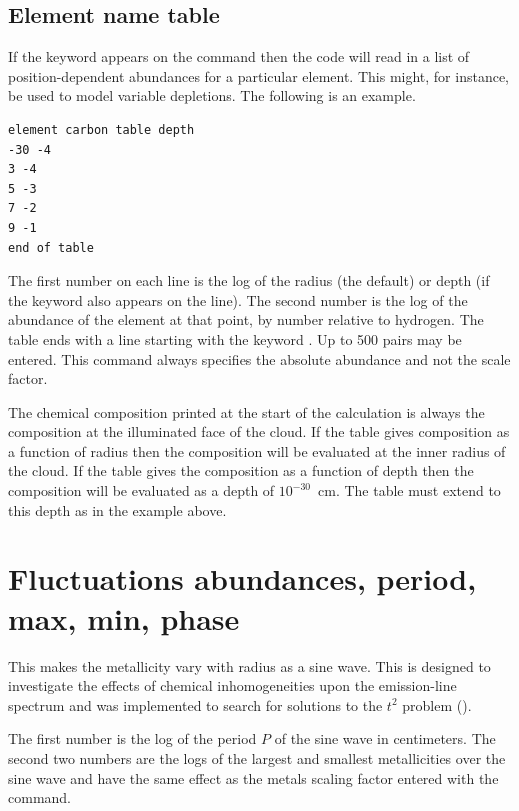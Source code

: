 \subsection{Element name table}

If the keyword  appears on
the  command then the code
will read in a list of position-dependent abundances for
a particular element.
This might, for instance, be used to model variable depletions.
The following is an example.
\begin{verbatim}
element carbon table depth
-30 -4
3 -4
5 -3
7 -2
9 -1
end of table
\end{verbatim}

The first number on each line is the log of the radius (the default)
or depth (if the keyword  also appears
on the  line).
The second number is the
log of the abundance of the element at that point, by number relative to
hydrogen.
The table ends with a line starting with the keyword
.
Up to 500 pairs may be entered.
This command always specifies the absolute
abundance and not the scale factor.

The chemical composition printed at the start of the calculation is always
the composition at the illuminated face of the cloud.  If the table gives
composition as a function of radius then the composition will be evaluated
at the inner radius of the cloud.  If the table gives the composition as
a function of depth then the composition will be evaluated as a depth of
$10^{-30}$~cm.  The table must extend to this depth as in the example above.

\section{Fluctuations abundances, period, max, min, phase}
\label{sec:FluctuationsAbundanceCommand}

This makes the metallicity vary with radius as a sine wave.  This is
designed to investigate the effects of chemical inhomogeneities upon the
emission-line spectrum and was implemented to search for solutions to the
$t^2$ problem (\citealp{KingdonFerland1995}).

The first number is the log of the period $P$ of the sine wave in
centimeters.
The second two numbers are the logs of the largest and smallest
metallicities over the sine wave and have the same effect as the metals
scaling factor entered with the  command.

